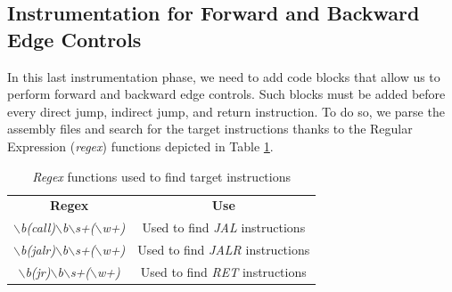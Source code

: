 \subsection{Instrumentation for Forward and Backward Edge Controls}
\label{subsec:project_instrcontrols}

In this last instrumentation phase, we need to add code blocks that allow us to
perform forward and backward edge controls. Such blocks must be added before every
direct jump, indirect jump, and return instruction. To do so, we parse the assembly
files and search for the target instructions thanks to the Regular Expression (\textit{regex})
functions depicted in Table \ref{tab:regexes}.

\begin{table}
  \centering
  \begin{tabular}{|c|c|}
    \hline
    \textbf{Regex}                                                                      & \textbf{Use}                            \\
    \hhline{==} \textit{$\backslash$b(call)$\backslash$b$\backslash$s+($\backslash$w+)} & Used to find \textit{JAL} instructions  \\
    \hline
    \textit{$\backslash$b(jalr)$\backslash$b$\backslash$s+($\backslash$w+)}             & Used to find \textit{JALR} instructions \\
    \hline
    \textit{$\backslash$b(jr)$\backslash$b$\backslash$s+($\backslash$w+)}               & Used to find \textit{RET} instructions  \\
    \hline
  \end{tabular}
  \caption{\textit{Regex} functions used to find target instructions}
  \label{tab:regexes}
\end{table}

